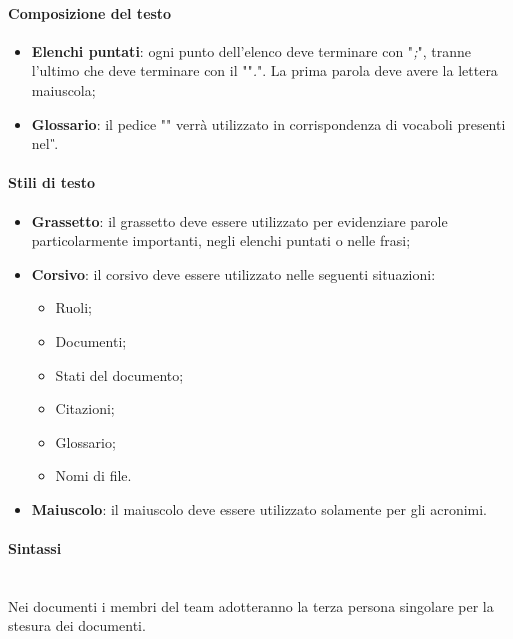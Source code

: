 	\paragraph{Composizione del testo}
	\begin{itemize}
		\item \textbf{Elenchi puntati}: ogni punto dell'elenco deve terminare con "\emph{;}",
		tranne l'ultimo che deve terminare con il ""\emph{.}". La prima parola deve avere la lettera
		maiuscola;
		\item \textbf{Glossario}: il pedice "" verrà utilizzato in corrispondenza di vocaboli presenti nel \textit{\G}.
	\end{itemize}
	\paragraph{Stili di testo}
	\begin{itemize}
		\item \textbf{Grassetto}: il grassetto deve essere utilizzato per evidenziare parole
		particolarmente importanti, negli elenchi puntati o nelle frasi;
		\item \textbf{Corsivo}: il corsivo deve essere utilizzato nelle seguenti
		situazioni:
		\begin{itemize}
			\item Ruoli;
			\item Documenti;
			\item Stati del documento;
			\item Citazioni;
			\item Glossario;
			\item Nomi di file.
		\end{itemize}
		\item \textbf{Maiuscolo}: il maiuscolo deve essere utilizzato solamente per gli acronimi.
	\end{itemize}
	\paragraph{Sintassi}
	~\\Nei documenti i membri del team adotteranno la terza persona singolare per la stesura dei documenti.
